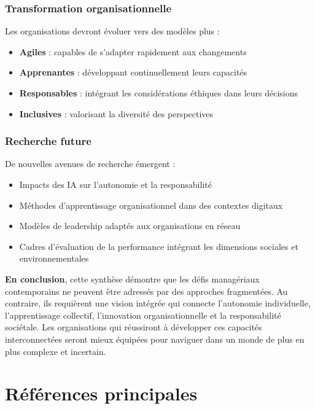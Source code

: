 \documentclass[12pt,a4paper]{article}
\begin{document}
\subsubsection{Transformation organisationnelle}
Les organisations devront évoluer vers des modèles plus :
\begin{itemize}
    \item \textbf{Agiles} : capables de s'adapter rapidement aux changements
    \item \textbf{Apprenantes} : développant continuellement leurs capacités
    \item \textbf{Responsables} : intégrant les considérations éthiques dans leurs décisions
    \item \textbf{Inclusives} : valorisant la diversité des perspectives
\end{itemize}

\subsubsection{Recherche future}
De nouvelles avenues de recherche émergent :
\begin{itemize}
    \item Impacts des IA sur l'autonomie et la responsabilité
    \item Méthodes d'apprentissage organisationnel dans des contextes digitaux
    \item Modèles de leadership adaptés aux organisations en réseau
    \item Cadres d'évaluation de la performance intégrant les dimensions sociales et environnementales
\end{itemize}

\vspace{1cm}
\noindent\textbf{En conclusion}, cette synthèse démontre que les défis managériaux contemporains ne peuvent être adressés par des approches fragmentées. Au contraire, ils requièrent une vision intégrée qui connecte l'autonomie individuelle, l'apprentissage collectif, l'innovation organisationnelle et la responsabilité sociétale. Les organisations qui réussiront à développer ces capacités interconnectées seront mieux équipées pour naviguer dans un monde de plus en plus complexe et incertain.

\newpage

\section*{Références principales}
\end{document}
